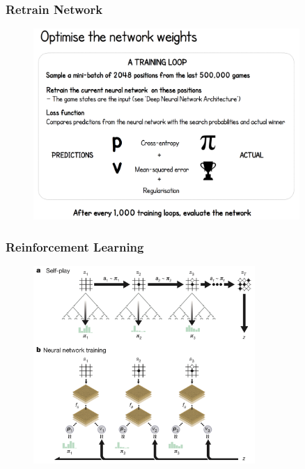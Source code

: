 \documentclass[notheorems, aspectratio=54]{beamer}
\begin{document}
\begin{frame}
    \frametitle{Retrain Network}

    \begin{figure}
        \includegraphics[width=0.9\textwidth]{fig/retrain_network.png}
    \end{figure}
\end{frame}

\begin{frame}
    \frametitle{Reinforcement Learning}

    \begin{figure}
        \includegraphics[width=0.75\textwidth]{fig/reinforcement_learning.png}
    \end{figure}
\end{frame}
\end{document}
